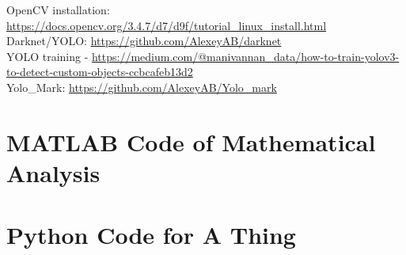 \documentclass[a4paper,12pt]{article}
\begin{document}
OpenCV installation: \href{https://docs.opencv.org/3.4.7/d7/d9f/tutorial_linux_install.html}{https://docs.opencv.org/3.4.7/d7/d9f/tutorial\_linux\_install.html}\\

Darknet/YOLO: \href{https://github.com/AlexeyAB/darknet}{https://github.com/AlexeyAB/darknet}\\

YOLO training - \href{https://medium.com/@manivannan_data/how-to-train-yolov3-to-detect-custom-objects-ccbcafeb13d2}{https://medium.com/@manivannan\_data/how-to-train-yolov3-to-detect-custom-objects-ccbcafeb13d2}\\

Yolo\_Mark: \href{https://github.com/AlexeyAB/Yolo_mark}{https://github.com/AlexeyAB/Yolo\_mark}\\


	\section{MATLAB Code of Mathematical Analysis}
	

	\section{Python Code for A Thing}
	

	
\end{document}
